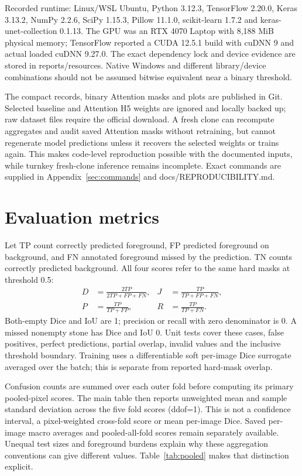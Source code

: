 \documentclass[a4paper,fleqn]{cas-sc}
\begin{document}
Recorded runtime: Linux/WSL Ubuntu, Python 3.12.3, TensorFlow 2.20.0, Keras 3.13.2, NumPy 2.2.6, SciPy 1.15.3, Pillow 11.1.0, scikit-learn 1.7.2 and keras-unet-collection 0.1.13. The GPU was an RTX 4070 Laptop with 8,188 MiB physical memory; TensorFlow reported a CUDA 12.5.1 build with cuDNN 9 and actual loaded cuDNN 9.27.0. The exact dependency lock and device evidence are stored in reports/resources. Native Windows and different library/device combinations should not be assumed bitwise equivalent near a binary threshold.

The compact records, binary Attention masks and plots are published in Git. Selected baseline and Attention H5 weights are ignored and locally backed up; raw dataset files require the official download. A fresh clone can recompute aggregates and audit saved Attention masks without retraining, but cannot regenerate model predictions unless it recovers the selected weights or trains again. This makes code-level reproduction possible with the documented inputs, while turnkey fresh-clone inference remains incomplete. Exact commands are supplied in Appendix~\ref{sec:commands} and docs/REPRODUCIBILITY.md.

\section{Evaluation metrics}
Let TP count correctly predicted foreground, FP predicted foreground on background, and FN annotated foreground missed by the prediction. TN counts correctly predicted background. All four scores refer to the same hard masks at threshold 0.5:
\begin{align}
 D&=\frac{2TP}{2TP+FP+FN}, & J&=\frac{TP}{TP+FP+FN},\\
 P&=\frac{TP}{TP+FP}, & R&=\frac{TP}{TP+FN}.
\end{align}
Both-empty Dice and IoU are 1; precision or recall with zero denominator is 0. A missed nonempty stone has Dice and IoU 0. Unit tests cover these cases, false positives, perfect predictions, partial overlap, invalid values and the inclusive threshold boundary. Training uses a differentiable soft per-image Dice surrogate averaged over the batch; this is separate from reported hard-mask overlap.

Confusion counts are summed over each outer fold before computing its primary pooled-pixel scores. The main table then reports unweighted mean and sample standard deviation across the five fold scores (ddof=1). This is not a confidence interval, a pixel-weighted cross-fold score or mean per-image Dice. Saved per-image macro averages and pooled-all-fold scores remain separately available. Unequal test sizes and foreground burdens explain why these aggregation conventions can give different values. Table~\ref{tab:pooled} makes that distinction explicit.
\end{document}
